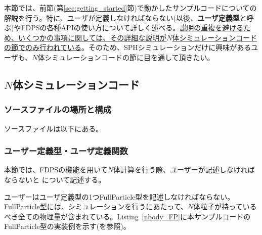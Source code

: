 本節では、前節(第\ref{sec:getting_started}節)で動かしたサンプルコードについての解説を行う。特に、ユーザが定義しなければならない\structure (以後、\textbf{ユーザ定義型}と呼ぶ)やFDPSの各種APIの使い方について詳しく述べる。\ul{説明の重複を避けるため、いくつかの事項に関しては、その詳細な説明が{$N$}体シミュレーションコードの節でのみ行われている}。そのため、SPHシミュレーションだけに興味があるユーザも、$N$体シミュレーションコードの節に目を通して頂きたい。

\subsection{$N$体シミュレーションコード}
\label{subsec:how_to_use:nbody}

\subsubsection{ソースファイルの場所と構成}
ソースファイルは\dirNameNbodySample 以下にある。

\subsubsection{ユーザー定義型・ユーザ定義関数}
本節では、FDPSの機能を用いて$N$体計算を行う際、ユーザーが記述しなければならない\structure と \procedure について記述する。

ユーザーはユーザ定義型の1つFullParticle型を記述しなければならない。FullParticle型には、シミュレーションを行うにあたって、$N$体粒子が持っているべき全ての物理量が含まれている。Listing~\ref{nbody_FP}に本サンプルコードのFullParticle型の実装例を示す(を参照)。

